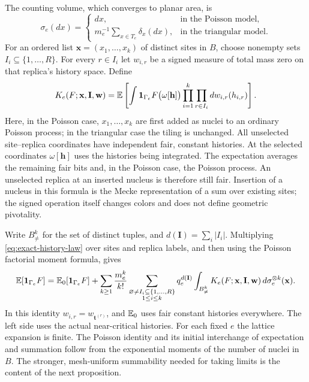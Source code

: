 The counting volume, which converges to planar area, is
\begin{equation}
 \sigma_e(dx)=
 \begin{cases}
 dx,&\text{in the Poisson model},\\
 m_e^{-1}\displaystyle\sum_{x\in T_e}\delta_x(dx),
       &\text{in the triangular model}.
 \end{cases}
 \label{eq:counting-volume}
\end{equation}
For an ordered list $\mathbf x=(x_1,\ldots,x_k)$ of distinct sites in
$B$, choose nonempty sets $I_i\subseteq\{1,\ldots,R\}$.
For every $r\in I_i$ let $w_{i,r}$ be a signed measure of total mass
zero on that replica's history space.  Define
\begin{equation}
 K_e(F;\mathbf x,\mathbf I,\mathbf w)
 =\mathbb E\left[
   \int \mathbf1_{\Gamma_e}
        F\bigl(\omega[\mathbf h]\bigr)
        \prod_{i=1}^k\prod_{r\in I_i}dw_{i,r}(h_{i,r})
       \right].
 \label{eq:site-kernel}
\end{equation}
Here, in the Poisson case, $x_1,\ldots,x_k$ are first added as nuclei
to an ordinary Poisson process; in the triangular case the tiling is
unchanged.  All unselected site--replica coordinates have independent
fair, constant histories.  At the selected coordinates
$\omega[\mathbf h]$ uses the histories being integrated.  The
expectation averages the remaining fair bits and, in the Poisson case,
the Poisson process.  An unselected replica at an inserted nucleus is
therefore still fair.  Insertion of a nucleus in this formula is the
Mecke representation of a sum over existing sites; the signed operation
itself changes colors and does not define geometric pivotality.

Write $B^k_{\ne}$ for the set of distinct tuples, and
$d(\mathbf I)=\sum_i|I_i|$.  Multiplying
\eqref{eq:exact-history-law} over sites and replica labels, and then
using the Poisson factorial moment formula, gives
\begin{equation}
 \mathbb E[\mathbf1_{\Gamma_e}F]
 =\mathbb E_0[\mathbf1_{\Gamma_e}F]
  +\sum_{k\geq1}\frac{m_e^k}{k!}
    \sum_{\substack{\varnothing\ne I_i\subseteq\{1,\ldots,R\}\\1\leq i\leq k}}
    q_e^{d(\mathbf I)}
    \int_{B^k_{\ne}}K_e(F;\mathbf x,\mathbf I,\mathbf w)
                                      \,d\sigma_e^{\otimes k}(\mathbf x).
 \label{eq:site-expansion}
\end{equation}
In this identity $w_{i,r}=w_{\mathbf t^{(r)}}$, and $\mathbb E_0$ uses fair
constant histories everywhere.  The left side uses the actual
near-critical histories.  For each fixed $e$ the lattice expansion is
finite.  The Poisson identity and its initial interchange of expectation
and summation follow from the exponential moments of the number of
nuclei in $B$.  The stronger, mesh-uniform summability needed for taking
limits is the content of the next proposition.

